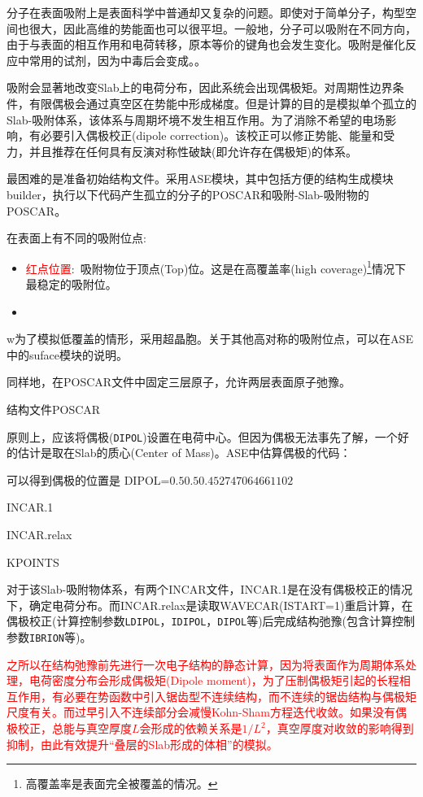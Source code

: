 分子在表面吸附上是表面科学中普通却又复杂的问题。即使对于简单分子，构型空间也很大，因此高维的势能面也可以很平坦。一般地，分子可以吸附在不同方向，由于与表面的相互作用和电荷转移，原本等价的键角也会发生变化。吸附是催化反应中常用的试剂，因为中毒后会变成。。

吸附会显著地改变\textrm{Slab}上的电荷分布，因此系统会出现偶极矩。对周期性边界条件，有限偶极会通过真空区在势能中形成梯度。但是计算的目的是模拟单个孤立的\textrm{Slab}-吸附体系，该体系与周期坏境不发生相互作用。为了消除不希望的电场影响，有必要引入偶极校正\textrm{(dipole correction)}。该校正可以修正势能、能量和受力，并且推荐在任何具有反演对称性破缺(即允许存在偶极矩)的体系。

最困难的是准备初始结构文件。采用\textrm{ASE}模块，其中包括方便的结构生成模块\textrm{builder}，执行以下代码产生孤立的分子的\textrm{POSCAR}和吸附-\textrm{Slab}-吸附物的\textrm{POSCAR}。

在表面上有不同的吸附位点:
\begin{itemize}
	\item \textcolor{red}{红点位置}:~吸附物位于顶点\textrm{(Top)}位。这是在高覆盖率\textrm{(high coverage)}\footnote{高覆盖率是表面完全被覆盖的情况。}情况下最稳定的吸附位。
	\item 
\end{itemize}
w为了模拟低覆盖的情形，采用超晶胞。关于其他高对称的吸附位点，可以在\textrm{ASE}中的\textrm{suface}模块的说明。

同样地，在\textrm{POSCAR}文件中固定三层原子，允许两层表面原子弛豫。

结构文件\textrm{POSCAR}

原则上，应该将偶极(\texttt{DIPOL})设置在电荷中心。但因为偶极无法事先了解，一个好的估计是取在\textrm{Slab}的质心\textrm{(Center of Mass)}。\textrm{ASE}中估算偶极的代码：

可以得到偶极的位置是
\textrm{DIPOL}=$0.5 0.5 0.452747064661102$

\textrm{INCAR.1}

\textrm{INCAR.relax}

\textrm{KPOINTS}

对于该\textrm{Slab-}吸附物体系，有两个\textrm{INCAR}文件，\textrm{INCAR.1}是在没有偶极校正的情况下，确定电荷分布。而\textrm{INCAR.relax}是读取\textrm{WAVECAR(ISTART=1)}重启计算，在偶极校正(计算控制参数\texttt{LDIPOL}，\texttt{IDIPOL}，\texttt{DIPOL}等)后完成结构弛豫(包含计算控制参数\texttt{IBRION}等)。

\textcolor{red}{之所以在结构弛豫前先进行一次电子结构的静态计算，因为将表面作为周期体系处理，电荷密度分布会形成偶极矩\textrm{(Dipole moment)}，为了压制偶极矩引起的长程相互作用，有必要在势函数中引入锯齿型不连续结构，而不连续的锯齿结构与偶极矩尺度有关。而过早引入不连续部分会减慢\textrm{Kohn-Sham}方程迭代收敛。如果没有偶极校正，总能与真空厚度$L$会形成的依赖关系是$1/L^2$，真空厚度对收敛的影响得到抑制，由此有效提升``叠层的\textrm{Slab}形成的体相''的模拟。}

